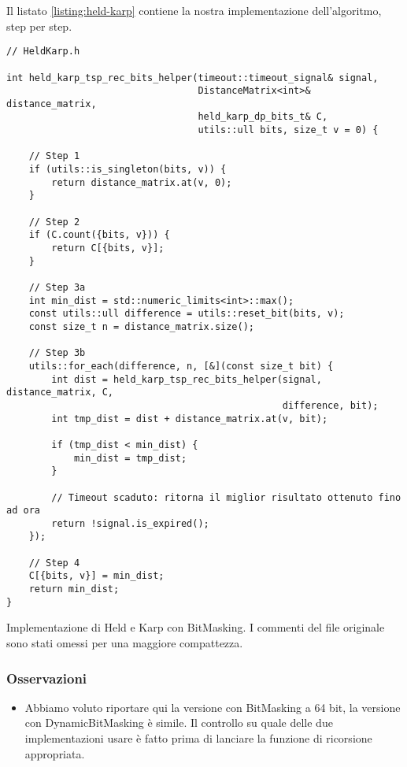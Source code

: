 \noindent Il listato \ref{listing:held-karp} contiene la nostra implementazione dell'algoritmo, step per step.

\begin{listing}[!ht]
\begin{verbatim}
// HeldKarp.h

int held_karp_tsp_rec_bits_helper(timeout::timeout_signal& signal,
                                  DistanceMatrix<int>& distance_matrix,
                                  held_karp_dp_bits_t& C,
                                  utils::ull bits, size_t v = 0) {
    
    // Step 1
    if (utils::is_singleton(bits, v)) {
        return distance_matrix.at(v, 0);
    }

    // Step 2 
    if (C.count({bits, v})) {
        return C[{bits, v}];
    }
    
    // Step 3a
    int min_dist = std::numeric_limits<int>::max();
    const utils::ull difference = utils::reset_bit(bits, v);
    const size_t n = distance_matrix.size();

    // Step 3b
    utils::for_each(difference, n, [&](const size_t bit) {
        int dist = held_karp_tsp_rec_bits_helper(signal, distance_matrix, C,
                                                 difference, bit);
        int tmp_dist = dist + distance_matrix.at(v, bit);

        if (tmp_dist < min_dist) {
            min_dist = tmp_dist;
        }

        // Timeout scaduto: ritorna il miglior risultato ottenuto fino ad ora
        return !signal.is_expired();
    });
    
    // Step 4
    C[{bits, v}] = min_dist;
    return min_dist;
}

\end{verbatim}
\caption{Implementazione di Held e Karp con BitMasking. I commenti del file originale sono stati omessi per una maggiore compattezza.}
\label{listing:held-karp}
\end{listing}

\subsubsection{Osservazioni}

\begin{itemize}
    \item Abbiamo voluto riportare qui la versione con BitMasking a 64 bit, la versione con DynamicBitMasking è simile. Il controllo su quale delle due implementazioni usare è fatto prima di lanciare la funzione di ricorsione appropriata.\\
\end{itemize}

